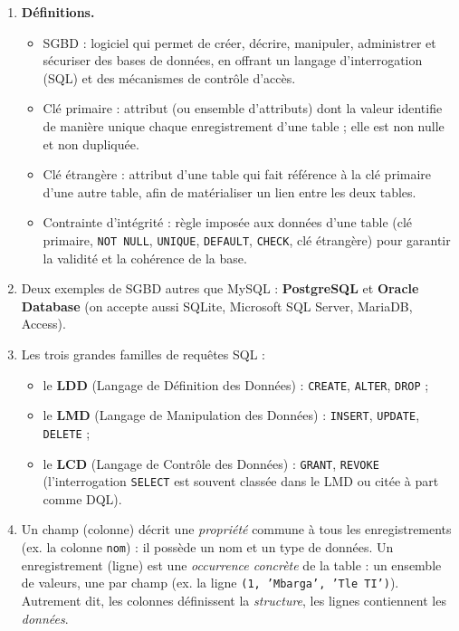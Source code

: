 \documentclass[11pt]{article}
\newcommand{\cle}[1]{{\popxbold\color{popdark}#1}}
\begin{document}
\begin{corrige}
\begin{enumerate}
\item \textbf{Définitions.}
\begin{itemize}
\item \cle{SGBD} : logiciel qui permet de créer, décrire, manipuler, administrer et sécuriser des bases de données, en offrant un langage d'interrogation (SQL) et des mécanismes de contrôle d'accès.
\item \cle{Clé primaire} : attribut (ou ensemble d'attributs) dont la valeur identifie de manière unique chaque enregistrement d'une table ; elle est non nulle et non dupliquée.
\item \cle{Clé étrangère} : attribut d'une table qui fait référence à la clé primaire d'une autre table, afin de matérialiser un lien entre les deux tables.
\item \cle{Contrainte d'intégrité} : règle imposée aux données d'une table (clé primaire, \texttt{NOT NULL}, \texttt{UNIQUE}, \texttt{DEFAULT}, \texttt{CHECK}, clé étrangère) pour garantir la validité et la cohérence de la base.
\end{itemize}
\item Deux exemples de SGBD autres que MySQL : \textbf{PostgreSQL} et \textbf{Oracle Database} (on accepte aussi SQLite, Microsoft SQL Server, MariaDB, Access).
\item Les trois grandes familles de requêtes SQL :
\begin{itemize}
\item le \textbf{LDD} (Langage de Définition des Données) : \texttt{CREATE}, \texttt{ALTER}, \texttt{DROP} ;
\item le \textbf{LMD} (Langage de Manipulation des Données) : \texttt{INSERT}, \texttt{UPDATE}, \texttt{DELETE} ;
\item le \textbf{LCD} (Langage de Contrôle des Données) : \texttt{GRANT}, \texttt{REVOKE} (l'interrogation \texttt{SELECT} est souvent classée dans le LMD ou citée à part comme DQL).
\end{itemize}
\item Un \cle{champ} (colonne) décrit une \emph{propriété} commune à tous les enregistrements (ex. la colonne \texttt{nom}) : il possède un nom et un type de données. Un \cle{enregistrement} (ligne) est une \emph{occurrence concrète} de la table : un ensemble de valeurs, une par champ (ex. la ligne \texttt{(1, 'Mbarga', 'Tle TI')}). Autrement dit, les colonnes définissent la \emph{structure}, les lignes contiennent les \emph{données}.
\end{enumerate}
\end{corrige}
\end{document}
